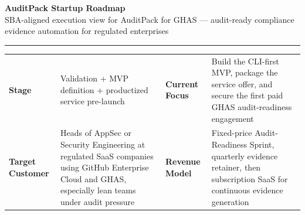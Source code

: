 \documentclass[10pt]{article}
\newcommand{\labelcell}[1]{\textcolor{TitleBlue}{\textbf{#1}}}
\begin{document}
{\LARGE\bfseries\textcolor{TitleBlue}{AuditPack Startup Roadmap}}\\[-0.1em]
{\normalsize\textcolor{TitleBlue}{SBA-aligned execution view for AuditPack for GHAS --- audit-ready compliance evidence automation for regulated enterprises}}

\vspace{0.45em}
{\color{RuleBlue}\rule{\textwidth}{0.9pt}}

\vspace{0.2em}
\begingroup
\setlength{\tabcolsep}{6pt}
\renewcommand{\arraystretch}{1.22}
\small
{}
\begin{tabularx}{\textwidth}{L{0.18\textwidth}>{\raggedright\arraybackslash}X L{0.20\textwidth}>{\raggedright\arraybackslash}X}
\labelcell{Stage} & Validation + MVP definition + productized service pre-launch & \labelcell{Current Focus} & Build the CLI-first MVP, package the service offer, and secure the first paid GHAS audit-readiness engagement \\
\labelcell{Target Customer} & Heads of AppSec or Security Engineering at regulated SaaS companies using GitHub Enterprise Cloud and GHAS, especially lean teams under audit pressure & \labelcell{Revenue Model} & Fixed-price Audit-Readiness Sprint, quarterly evidence retainer, then subscription SaaS for continuous evidence generation \\
\end{tabularx}
\endgroup
\end{document}
